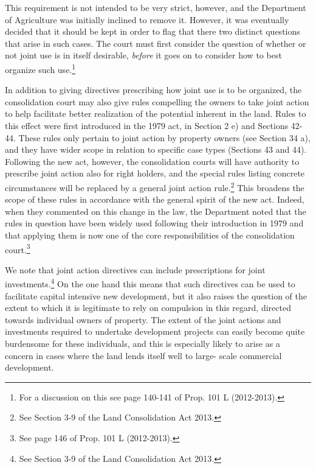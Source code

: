 This requirement is not intended to be very strict, however, and the Department of Agriculture was initially inclined to remove it. However, it was eventually decided that it should be kept in order to flag that there two distinct questions that arise in such cases. The court must first consider the question of whether or not joint use is in itself desirable, \emph{before} it goes on to consider how to best organize such use.\footnote{For a discussion on this see page 140-141 of Prop. 101 L (2012-2013).}

In addition to giving directives prescribing how joint use is to be organized, the consolidation court may also give rules compelling the owners to take joint action to help facilitate better realization of the potential inherent in the land. Rules to this effect were first introduced in the 1979 act, in Section 2 e) and Sections 42-44. These rules only pertain to joint action by property owners (see Section 34 a), and they have wider scope in relation to specific case types (Sections 43 and 44). Following the new act, however, the consolidation courts will have authority to prescribe joint action also for right holders, and the special rules listing concrete circumstances will be replaced by a general joint action rule.\footnote{See Section 3-9 of the Land Consolidation Act 2013.} This broadens the scope of these rules in accordance with the general spirit of the new act. Indeed, when they commented on this change in the law, the Department noted that the rules in question have been widely used following their introduction in 1979 and that applying them is now one of the core responsibilities of the consolidation court.\footnote{See page 146 of Prop. 101 L (2012-2013).}

We note that joint action directives can include prescriptions for joint investments.\footnote{See Section 3-9 of the Land Consolidation Act 2013.} On the one hand this means that such directives can be used to facilitate capital intensive new development, but it also raises the question of the extent to which it is legitimate to rely on compulsion in this regard, directed towards individual owners of property. The extent of the joint actions and investments required to undertake development projects can easily become quite burdensome for these individuals, and this is especially likely to arise as a concern in cases where the land lends itself well to large- scale commercial development.

